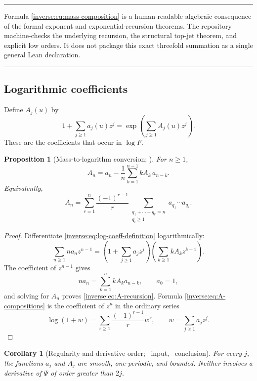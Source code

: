 \documentclass[11pt,oneside]{article}
\newtheorem{proposition}[theorem]{Proposition}
\newtheorem{corollary}[theorem]{Corollary}
\theoremstyle{definition}
\theoremstyle{remark}
\newenvironment{boxedremark}{%
  \par\smallskip\noindent\begin{center}\begin{minipage}{0.94\textwidth}%
  \color{black}\hrule\vspace{0.6em}\small
}{%
  \vspace{0.6em}\hrule\end{minipage}\end{center}\smallskip
}
\begin{document}
\begin{boxedremark}
Formula \eqref{inverse:eq:mass-composition} is a human-readable algebraic
consequence of the formal exponent and exponential-recursion theorems.
The repository machine-checks the underlying recursion, the structural
top-jet theorem, and explicit low orders.  It does not package this exact
threefold summation as a single general Lean declaration.
\end{boxedremark}

\subsection{Logarithmic coefficients}

Define $A_j(u)$ by
\begin{equation}
 1+\sum_{j\geq1}a_j(u)z^j
 =\exp\!\left(\sum_{j\geq1}A_j(u)z^j\right).
 \label{inverse:eq:log-coeff-definition}
\end{equation}
These are the coefficients that occur in $\log F$.

\begin{proposition}[Mass-to-logarithm conversion; \Formalized]
\label{inverse:prop:log-recursion}
For $n\geq1$,
\begin{equation}
 A_n
 =a_n-\frac1n\sum_{k=1}^{n-1}kA_k\,a_{n-k}.
 \label{inverse:eq:A-recursion}
\end{equation}
Equivalently,
\begin{equation}
 A_n
 =\sum_{r=1}^n\frac{(-1)^{r-1}}r
   \sum_{\substack{q_1+\cdots+q_r=n\\q_i\geq1}}
   a_{q_1}\cdots a_{q_r}. \label{inverse:eq:A-compositions}
\end{equation}
\end{proposition}

\begin{proof}
Differentiate \eqref{inverse:eq:log-coeff-definition} logarithmically:
\[
 \sum_{n\geq1}na_nz^{n-1}
 =
 \left(1+\sum_{j\geq1}a_jz^j\right)
 \left(\sum_{k\geq1}kA_kz^{k-1}\right).
\]
The coefficient of $z^{n-1}$ gives
\[
 na_n=\sum_{k=1}^n kA_ka_{n-k},
 \qquad a_0=1,
\]
and solving for $A_n$ proves \eqref{inverse:eq:A-recursion}.  Formula
\eqref{inverse:eq:A-compositions} is the coefficient of $z^n$ in the ordinary
series
\[
 \log(1+w)=\sum_{r\geq1}\frac{(-1)^{r-1}}r w^r,
 \qquad w=\sum_{j\geq1}a_jz^j.
\]
\end{proof}

\begin{corollary}[Regularity and derivative order; \Formalized\ input,
\Derived\ conclusion]
\label{inverse:cor:A-structure}
For every $j$, the functions $a_j$ and $A_j$ are smooth, one-periodic,
and bounded.  Neither involves a derivative of $\Psi$ of order greater
than $2j$.
\end{corollary}
\end{document}
